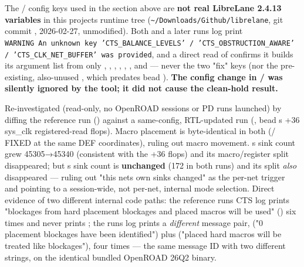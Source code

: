 \begin{record}

The  /  config keys
used in the section above are \textbf{not real LibreLane 2.4.13
variables} in this project\textquotesingle s runtime tree
(\texttt{\textasciitilde{}/\allowbreak{}Downloads/\allowbreak{}Github/\allowbreak{}librelane},
git commit , 2026-02-27, unmodified). Both
 and a later
 run\textquotesingle s log print
\texttt{WARNING\ An\ unknown\ key\ 'CTS\_\allowbreak{}BALANCE\_\allowbreak{}LEVELS'\ /\allowbreak{}\ 'CTS\_\allowbreak{}OBSTRUCTION\_\allowbreak{}AWARE'\ /\allowbreak{}\ 'CTS\_\allowbreak{}CLK\_\allowbreak{}NET\_\allowbreak{}BUFFER'\ was\ provided},
and a direct read of  confirms
it builds its  argument list from only
, ,
,
,
, ,
and  --- never the two "fix" keys (nor the
pre-existing, also-unused , which predates bead
). \textbf{The config change in /
was silently ignored by the tool; it did not cause the clean-hold
result.}

Re-investigated (read-only, no OpenROAD sessions or PD runs launched) by
diffing the reference run () against a
same-config, RTL-updated run (, bead
\textquotesingle s +36 sys\_clk registered-read flops). Macro
placement is byte-identical in both (/ FIXED at
the same DEF coordinates), ruling out macro movement.
\textquotesingle s sink count grew 45305→45340 (consistent
with the +36 flops) and its macro/\allowbreak{}register split
disappeared; but \textquotesingle s sink count is
\textbf{unchanged} (172 in both runs) and its split \emph{also}
disappeared --- ruling out "this net\textquotesingle s own sinks
changed" as the per-net trigger and pointing to a session-wide, not
per-net, internal mode selection. Direct evidence of two different
internal code paths: the reference run\textquotesingle s CTS log prints
"blockages from hard placement blockages and placed macros will be used"
() six times and never prints ; the
 run\textquotesingle s log prints a \emph{different} message
pair,  ("0 placement blockages have been identified")
plus  ("placed hard macros will be treated like
blockages"), four times --- the same message ID with two different
strings, on the identical bundled OpenROAD 26Q2 binary.


\end{record}

